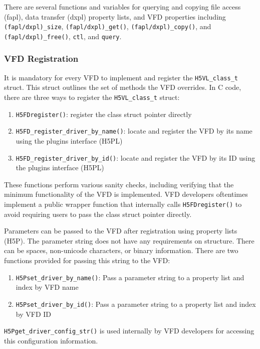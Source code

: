 There are several functions and variables for querying and copying file access (fapl), data transfer (dxpl) property lists, and VFD properties including \texttt{(fapl/dxpl)\_size}, \texttt{(fapl/dxpl)\_get()}, \texttt{(fapl/dxpl)\_copy()}, and \texttt{(fapl/dxpl)_free()}, \texttt{ctl}, and \texttt{query}.


\subsubsection{VFD Registration}

It is mandatory for every VFD to implement and register the \texttt{H5VL\_class\_t} struct. This struct outlines the set of methods the VFD overrides. In C code, there are three ways to register the \texttt{H5VL\_class\_t} struct: 
\begin{enumerate}
    \item \texttt{H5FDregister()}: register the class struct pointer directly
    \item \texttt{H5FD\_register\_driver\_by\_name()}: locate and register the VFD by its name using the plugins interface (H5PL)
    \item \texttt{H5FD\_register\_driver\_by\_id()}: locate and register the VFD by its ID using the plugins interface (H5PL)
\end{enumerate}
These functions perform various sanity checks, including verifying that the minimum functionality of the VFD is implemented. VFD developers oftentimes implement a public wrapper function that internally calls \texttt{H5FDregister()} to avoid requiring users to pass the class struct pointer directly.

Parameters can be passed to the VFD after registration using property lists (H5P). The parameter string does not have any requirements on structure. There can be spaces, non-unicode characters, or binary information.  There are two functions provided for passing this string to the VFD:
\begin{enumerate}
    \item \texttt{H5Pset\_driver\_by\_name()}: Pass a parameter string to a property list and index by VFD name
    \item \texttt{H5Pset\_driver\_by\_id()}: Pass a parameter string to a property list and index by VFD ID
\end{enumerate}
\texttt{H5Pget\_driver\_config\_str()} is used internally by VFD developers for accessing this configuration information.

